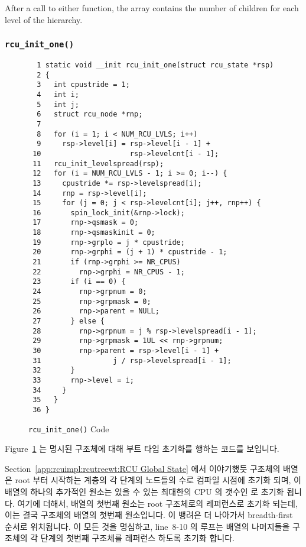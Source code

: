 After a call to either function, the  array contains
the number of children for each level of the  hierarchy.
\fi

\subsubsection{\tt rcu\_init\_one()}
\label{app:rcuimpl:rcutreewt:rcu-init-one}

\begin{figure}[tbp]
{ \scriptsize
\begin{verbatim}
  1 static void __init rcu_init_one(struct rcu_state *rsp)
  2 {
  3   int cpustride = 1;
  4   int i;
  5   int j;
  6   struct rcu_node *rnp;
  7
  8   for (i = 1; i < NUM_RCU_LVLS; i++)
  9     rsp->level[i] = rsp->level[i - 1] +
 10                     rsp->levelcnt[i - 1];
 11   rcu_init_levelspread(rsp);
 12   for (i = NUM_RCU_LVLS - 1; i >= 0; i--) {
 13     cpustride *= rsp->levelspread[i];
 14     rnp = rsp->level[i];
 15     for (j = 0; j < rsp->levelcnt[i]; j++, rnp++) {
 16       spin_lock_init(&rnp->lock);
 17       rnp->qsmask = 0;
 18       rnp->qsmaskinit = 0;
 19       rnp->grplo = j * cpustride;
 20       rnp->grphi = (j + 1) * cpustride - 1;
 21       if (rnp->grphi >= NR_CPUS)
 22         rnp->grphi = NR_CPUS - 1;
 23       if (i == 0) {
 24         rnp->grpnum = 0;
 25         rnp->grpmask = 0;
 26         rnp->parent = NULL;
 27       } else {
 28         rnp->grpnum = j % rsp->levelspread[i - 1];
 29         rnp->grpmask = 1UL << rnp->grpnum;
 30         rnp->parent = rsp->level[i - 1] +
 31                 j / rsp->levelspread[i - 1];
 32       }
 33       rnp->level = i;
 34     }
 35   }
 36 }
\end{verbatim}
}
\caption{{\tt rcu\_init\_one()} Code}
\label{fig:app:rcuimpl:rcutreewt:Code for rcu-init-one}
\end{figure}

Figure~\ref{fig:app:rcuimpl:rcutreewt:Code for rcu-init-one}
는 명시된  구조체에 대해 부트 타임 초기화를 행하는
 코드를 보입니다.

Section~\ref{app:rcuimpl:rcutreewt:RCU Global State}
에서 이야기했듯  구조체의  배열은 root 부터
시작하는 계층의 각 단계의 노드들의 수로 컴파일 시점에 초기화 되며, 이 배열의
하나의 추가적인 원소는 있을 수 있는 최대한의 CPU 의 갯수인  로
초기화 됩니다.
여기에 더해서,  배열의 첫번째 원소는 root 
구조체로의 레퍼런스로 초기화 되는데, 이는 결국  구조체의
 배열의 첫번째 원소입니다.
이 뱅려은 더 나아가서 breadth-first 순서로 위치됩니다.
이 모든 것을 명심하고, line~8-10 의 루프는  배열의 나머지들을
 구조체의 각 단계의 첫번째  구조체를 레퍼런스 하도록
초기화 합니다.
\iffalse

